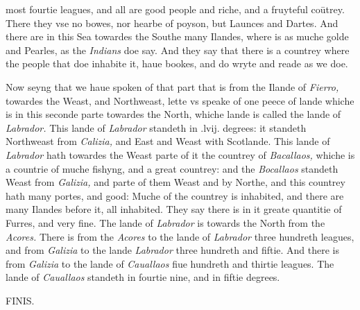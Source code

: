 \documentclass[11pt,twoside]{article}\makeatletter
\begin{document}
 most fourtie leagues, and all are good people and riche, and a fruyteful coūtrey. There they vse no bowes, nor hearbe of poy­son, but Launces and Dartes. And there are in this Sea to­wardes the Southe many Ilandes, where is as muche golde and Pearles, as the {\itshape Indians} doe say. And they say that there is a countrey where the people that doe inhabite it, haue bookes, and do wryte and reade as we doe.\par
Now seyng that we haue spoken of that part that is from the Ilande of {\itshape Fierro,} towardes the Weast, and Northweast, lette vs speake of one peece of lande whiche is in this seconde parte towardes the North, whiche lande is called the lande of {\itshape Labrador.} This lande of {\itshape Labrador} standeth in .lvij. degrees: it standeth Northweast from {\itshape Calizia,} and East and Weast with Scotlande. This lande of {\itshape Labrador} hath towardes the Weast parte of it the countrey of {\itshape Bacallaos,} whiche is a coun­trie of muche fishyng, and a great countrey: and the {\itshape Bocallaos} standeth Weast from {\itshape Galizia,} and parte of them Weast and by Northe, and this countrey hath many portes, and good: Muche of the countrey is inhabited, and there are many Ilandes before it, all inhabited. They say there is in it greate quantitie of Furres, and very fine. The lande of {\itshape Labrador} is towards the North from the {\itshape Acores.} There is from the {\itshape A­cores} to the lande of {\itshape Labrador} three hundreth leagues, and from {\itshape Galizia} to the lande {\itshape Labrador} three hundreth and fiftie. And there is from {\itshape Galizia} to the lande of {\itshape Cauallaos} fiue hundreth and thirtie leagues. The lande of {\itshape Cauallaos} standeth in fourtie nine, and in fiftie degrees.

\begin{raggedleft}FINIS.\end{raggedleft}
\end{document}
